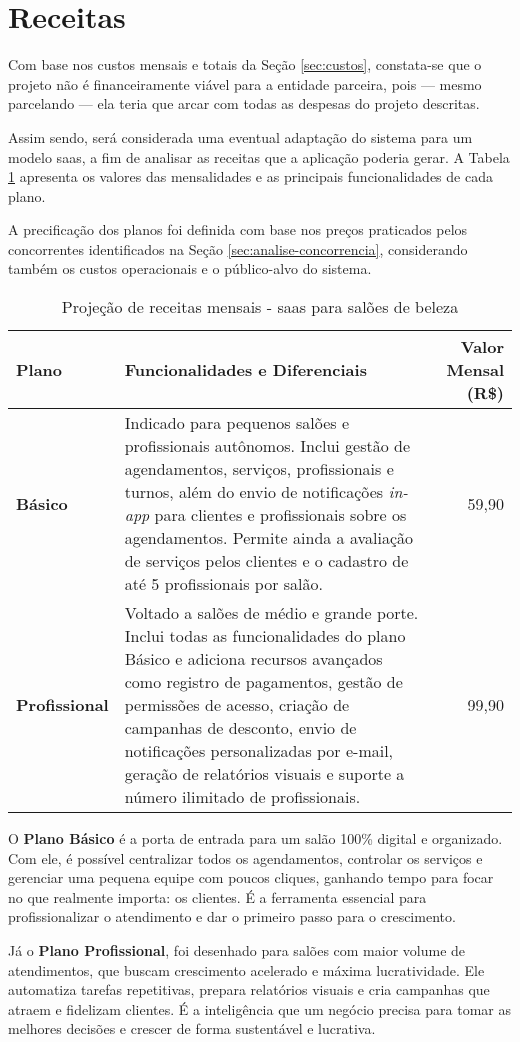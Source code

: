 \section{Receitas}

Com base nos custos mensais e totais da Seção \ref{sec:custos}, constata-se que o projeto não é financeiramente viável para a entidade parceira, pois --- mesmo parcelando --- ela teria que arcar com todas as despesas do projeto descritas.

Assim sendo, será considerada uma eventual adaptação do sistema para um modelo \gls{saas}, a fim de analisar as receitas que a aplicação poderia gerar. A Tabela \ref{tab:receitas-saas} apresenta os valores das mensalidades e as principais funcionalidades de cada plano.

A precificação dos planos foi definida com base nos preços praticados pelos concorrentes identificados na Seção \ref{sec:analise-concorrencia}, considerando também os custos operacionais e o público-alvo do sistema. 

\begin{table}[htbp]
	\centering
	\caption{Projeção de receitas mensais - \gls{saas} para salões de beleza}
	\label{tab:receitas-saas}
	\begin{tabular}{p{3cm}p{7cm}r}
		\toprule
		\rowcolor{myblue}\textbf{Plano} & \textbf{Funcionalidades e Diferenciais} & \textbf{Valor Mensal (R\$)} \\
		\midrule
		\textbf{Básico} & Indicado para pequenos salões e profissionais autônomos. Inclui gestão de agendamentos, serviços, profissionais e turnos, além do envio de notificações \textit{in-app} para clientes e profissionais sobre os agendamentos. Permite ainda a avaliação de serviços pelos clientes e o cadastro de até 5 profissionais por salão. & 59,90 \\
		\addlinespace
		\textbf{Profissional} & Voltado a salões de médio e grande porte. Inclui todas as funcionalidades do plano Básico e adiciona recursos avançados como registro de pagamentos, gestão de permissões de acesso, criação de campanhas de desconto, envio de notificações personalizadas por e-mail, geração de relatórios visuais e suporte a número ilimitado de profissionais. & 99,90 \\
		\bottomrule
	\end{tabular}
\end{table}

O \textbf{Plano Básico} é a porta de entrada para um salão 100\% digital e organizado. Com ele, é possível centralizar todos os agendamentos, controlar os serviços e gerenciar uma pequena equipe com poucos cliques, ganhando tempo para focar no que realmente importa: os clientes. É a ferramenta essencial para profissionalizar o atendimento e dar o primeiro passo para o crescimento.

Já o \textbf{Plano Profissional}, foi desenhado para salões com maior volume de atendimentos, que buscam crescimento acelerado e máxima lucratividade. Ele automatiza tarefas repetitivas, prepara relatórios visuais e cria campanhas que atraem e fidelizam clientes. É a inteligência que um negócio precisa para tomar as melhores decisões e crescer de forma sustentável e lucrativa.
